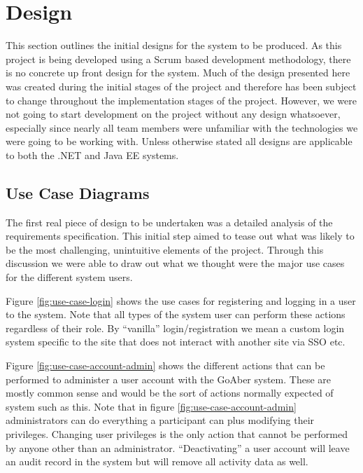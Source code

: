 \chapter{Design}

This section outlines the initial designs for the system to be produced. As this project is being developed using a Scrum based development methodology, there is no concrete up front design for the system. Much of the design presented here was created during the initial stages of the project and therefore has been subject to change throughout the implementation stages of the project. However, we were not going to start development on the project without any design whatsoever, especially since nearly all team members were unfamiliar with the technologies we were going to be working with. Unless otherwise stated all designs are applicable to both the .NET and Java EE systems.

\section{Use Case Diagrams}

The first real piece of design to be undertaken was a detailed analysis of the requirements specification. This initial step aimed to tease out what was likely to be the most challenging, unintuitive elements of the project. Through this discussion we were able to draw out what we thought were the major use cases for the different system users.

Figure \ref{fig:use-case-login} shows the use cases for registering and logging in a user to the system. Note that all types of the system user can perform these actions regardless of their role. By ``vanilla'' login/registration we mean a custom login system specific to the site that does not interact with another site via SSO etc.

Figure \ref{fig:use-case-account-admin} shows the different actions that can be performed to administer a user account with the GoAber system. These are mostly common sense and would be the sort of actions normally expected of system such as this. Note that in figure \ref{fig:use-case-account-admin} administrators can do everything a participant can plus modifying their privileges. Changing user privileges is the only action that cannot be performed by anyone other than an administrator. ``Deactivating'' a user account will leave an audit record in the system but will remove all activity data as well. 


